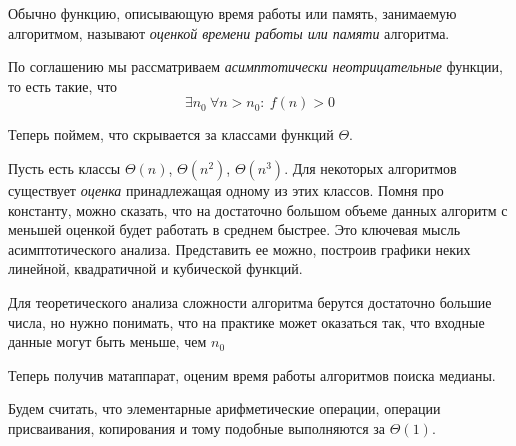 \documentclass[../book.tex]{subfiles}
\begin{document}
	\begin{remark}
		Обычно функцию, описывающую время работы или память, занимаемую алгоритмом, называют \textit{оценкой времени работы или памяти} алгоритма.
	\end{remark}
	
	\begin{remark}
		По соглашению мы рассматриваем \textit{асимптотически неотрицательные} функции, то есть такие, что 
		\[
		\exists n_0 \ \forall n > n_0: \ f(n) > 0
		\]
	\end{remark}
	
	Теперь поймем, что скрывается за классами функций $\Theta$.
	
	Пусть есть классы $\Theta(n)$, $\Theta(n^2)$, $\Theta(n^3)$. Для некоторых алгоритмов существует \textit{оценка} принадлежащая одному из этих классов. Помня про константу, можно сказать, что на достаточно большом объеме данных алгоритм с меньшей оценкой будет работать в среднем быстрее. Это ключевая мысль асимптотического анализа. Представить ее можно, построив графики неких линейной, квадратичной и кубической функций.
	
	\begin{center}
	\end{center}
	
	Для теоретического анализа сложности алгоритма берутся достаточно большие числа, но нужно понимать, что на практике может оказаться так, что входные данные могут быть меньше, чем $n_0$
	
	
	Теперь получив матаппарат, оценим время работы алгоритмов поиска медианы.
	
	\begin{remark}
		Будем считать, что элементарные арифметические операции, операции присваивания, копирования и тому подобные выполняются за $\Theta(1)$.
	\end{remark}
	
\end{document}
